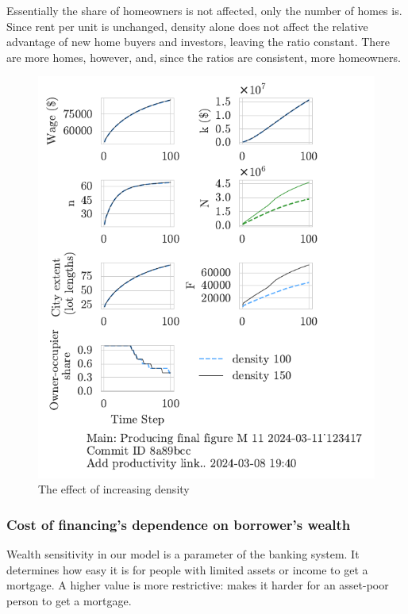 Essentially the share of homeowners is not affected, only the number of homes is. Since rent per unit is unchanged, density alone does not affect the relative advantage of new home buyers and investors, leaving the ratio constant. There are more homes, however, and, since the ratios are consistent, more homeowners. 

\begin{figure}[h!bt]
    \centering
    \includegraphics[scale=.8, trim={0 1.4cm 0 0},clip]{fig/density-Main-123417.pdf}
    \caption{The effect of increasing density}
    \label{fig:density_ownership_trajectory}
\end{figure}


\newpage

\subsubsection{Cost of financing's dependence on borrower's wealth}
Wealth sensitivity in our model is a parameter of the banking system. It determines how easy it is for people with limited assets or income to get a mortgage. A higher value is more restrictive:  makes it harder for an asset-poor person to get a mortgage.

